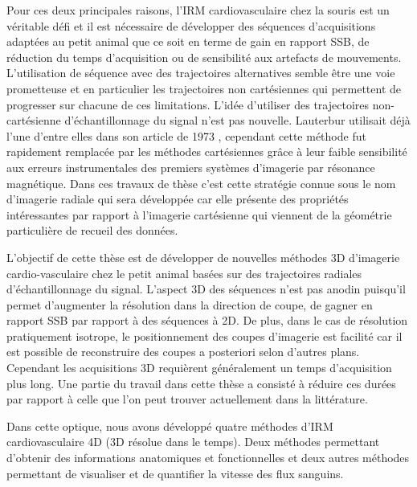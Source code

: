 \medbreak
Pour ces deux principales raisons, l'IRM cardiovasculaire chez la souris est un véritable défi et il est nécessaire de développer des séquences d'acquisitions adaptées au petit animal que ce soit en terme de gain en rapport \gls{SSB}, de réduction du temps d'acquisition ou de sensibilité aux artefacts de mouvements. L'utilisation de séquence avec des trajectoires alternatives semble être une voie prometteuse et en particulier les trajectoires non cartésiennes qui permettent de progresser sur chacune de ces limitations. L'idée d'utiliser des trajectoires non-cartésienne d'échantillonnage du signal n'est pas nouvelle. Lauterbur utilisait déjà l'une d'entre elles dans son article de 1973 \cite{lauterbur1973image}, cependant cette méthode fut rapidement remplacée par les méthodes cartésiennes grâce à leur faible sensibilité aux erreurs instrumentales des premiers systèmes d'imagerie par résonance magnétique. Dans ces travaux de thèse c'est cette stratégie connue sous le nom d'imagerie radiale qui sera développée car elle présente des propriétés intéressantes par rapport à l'imagerie cartésienne qui viennent de la géométrie particulière de recueil des données.

\medbreak
L'objectif de cette thèse est de développer de nouvelles méthodes 3D d'imagerie cardio-vasculaire chez le petit animal basées sur des trajectoires radiales d'échantillonnage du signal. L'aspect 3D des séquences n'est pas anodin puisqu'il permet d'augmenter la résolution dans la direction de coupe, de gagner en rapport \gls{SSB} par rapport à des séquences à 2D. De plus, dans le cas de résolution pratiquement isotrope, le positionnement des coupes d'imagerie est facilité car il est possible de reconstruire des coupes a posteriori selon d'autres plans. Cependant les acquisitions 3D requièrent généralement un temps d'acquisition plus long. Une partie du travail dans cette thèse a consisté à réduire ces durées par rapport à celle que l'on peut trouver actuellement dans la littérature.

Dans cette optique, nous avons développé quatre méthodes d'IRM cardiovasculaire 4D (3D résolue dans le temps). 
Deux méthodes permettant d'obtenir des informations anatomiques et fonctionnelles et deux autres méthodes permettant de visualiser et de quantifier la vitesse des flux sanguins. 
\medbreak


